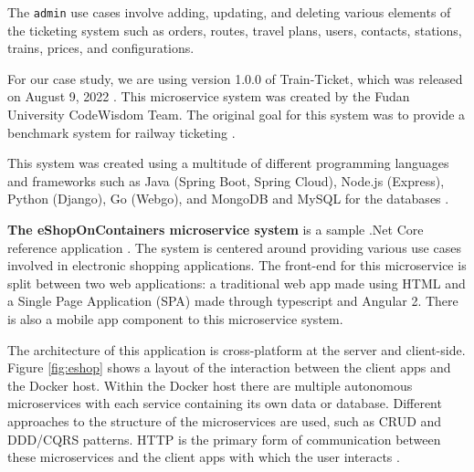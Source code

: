 The \texttt{admin} use cases involve adding, updating, and deleting various elements of the ticketing system such as orders, routes, travel plans, users, contacts, stations, trains, prices, and configurations.

For our case study, we are using version 1.0.0 of Train-Ticket, which was released on August 9, 2022 \cite{trainticket}. This microservice system was created by the Fudan University CodeWisdom Team. The original goal for this system was to provide a benchmark system for railway ticketing \cite{zhou2018benchmarking}.

This system was created using a multitude of different programming languages and frameworks such as Java (Spring Boot, Spring Cloud), Node.js (Express), Python (Django), Go (Webgo), and MongoDB and MySQL for the databases \cite{trainticket}.


{\bf The eShopOnContainers microservice system} is a sample .Net Core reference application \cite{eshop}. The system is centered around providing various use cases involved in electronic shopping applications. The front-end for this microservice is split between two web applications: a traditional web app made using HTML and a Single Page Application (SPA) made through typescript and Angular 2. There is also a mobile app component to this microservice system.

The architecture of this application is cross-platform at the server and client-side. Figure \ref{fig:eshop} shows a layout of the interaction between the client apps and the Docker host. Within the Docker host there are multiple autonomous microservices with each service containing its own data or database. Different approaches to the structure of the microservices are used, such as CRUD and DDD/CQRS patterns. HTTP is the primary form of communication between these microservices and the client apps with which the user interacts \cite{eshop}. 

